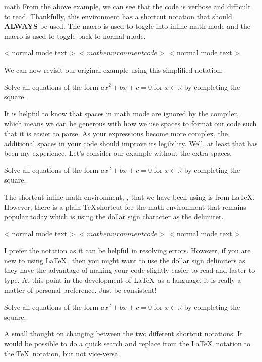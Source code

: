 \begin{docEnvironment*}[doclang/environment content=mathematics content goes here]{math}{}{}
From the above example, we can see that the code is verbose and difficult to
read.  Thankfully, this environment has a shortcut notation that should 
\textbf{ALWAYS} be used.  The macro \cs{(} is used to toggle into inline math mode 
and the macro \cs{)} is used to toggle back to normal mode. 
\begin{dispListing}
< normal mode text > \( < math environment code > \) < normal mode text > 
\end{dispListing}
We can now revisit our original example using this simplified notation.
\begin{dispExample}
Solve all equations of the form \( ax^2 + bx + c = 0 \) 
for \( x \in \mathbb{R} \) by completing the square.
\end{dispExample}
It is helpful to know that spaces in math mode are ignored by the 
compiler, which means we can be generous with how we use spaces to format
our code such that it is easier to parse. As your expressions become more 
complex, the additional spaces in your code should improve its legibility.  
Well, at least that has been my experience.  Let's consider our
example without the extra spaces.
\begin{dispExample}
Solve all equations of the form \(ax^2+bx+c=0\) for
\(x\in\mathbb{R}\) by completing the square.
\end{dispExample}
The shortcut inline math environment, \cs{(}\cs{)}, that we 
have been using is from \LaTeX.  However, there is a plain \TeX\,shortcut
for the math environment that remains popular today which is using the dollar
sign character as the delimiter.
\begin{dispListing}
< normal mode text > $ < math environment code > $ < normal mode text > 
\end{dispListing}
I prefer the \cs{(}  \cs{)} notation as it can be helpful
in resolving errors.  However, if you are new to using \LaTeX\,, then you might
want to use the dollar sign delimiters as they have the advantage of making 
your code slightly easier to read and faster to type.  At this point in the 
development of \LaTeX\, as a language, it is really a matter of personal 
preference.  Just be consistent!
\begin{dispExample}
Solve all equations of the form $ ax^2 + bx + c = 0 $ for 
$ x \in \mathbb{R} $ by completing the square.
\end{dispExample}
A small thought on changing between the two different shortcut notations. It 
would be possible to do a quick search and replace from the \LaTeX\, notation to 
the \TeX\, notation, but not vice-versa. 
\end{docEnvironment*}

